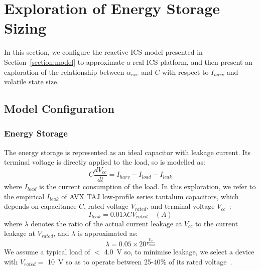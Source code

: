 
\section{Exploration of Energy Storage Sizing} \label{section:exploration}


In this section, we configure the reactive ICS model presented in Section~\ref{section:model} to approximate a real ICS platform, and then present an exploration of the relationship between $\alpha_{exe}$ and $C$ with respect to $I_{harv}$ and volatile state size.

\subsection{Model Configuration}

\subsubsection{Energy Storage}

The energy storage is represented as an ideal capacitor with leakage current. Its terminal voltage is directly applied to the load, so is modelled as:
\begin{equation}
  C \frac{dV_{cc}}{dt} = I_{harv} - I_{load} - I_{leak}
\end{equation}
where $I_{load}$ is the current consumption of the load. In this exploration, we refer to the empirical $I_{leak}$ of AVX TAJ low-profile series tantalum capacitors, which depends on capacitance $C$, rated voltage $V_{rated}$, and terminal voltage $V_{cc}$~\cite{avxleakage}:
\begin{equation}
    I_{leak} = 0.01 \lambda C V_{rated} \quad (A)
\end{equation}
where $\lambda$ denotes the ratio of the actual current leakage at $V_{cc}$ to the current leakage at $V_{rated}$, and $\lambda$ is approximated as: 
\begin{equation}
    \lambda = 0.05 \times 20^{\frac{V_{cc}}{V_{rated}}}
\end{equation}
We assume a typical load of $<$ \SI{4.0}{\volt} so, to minimise leakage, we select a device with $V_{rated} =$ \SI{10}{\volt} so as to operate between 25-40\% of its rated voltage~\cite{avxleakage}. 

